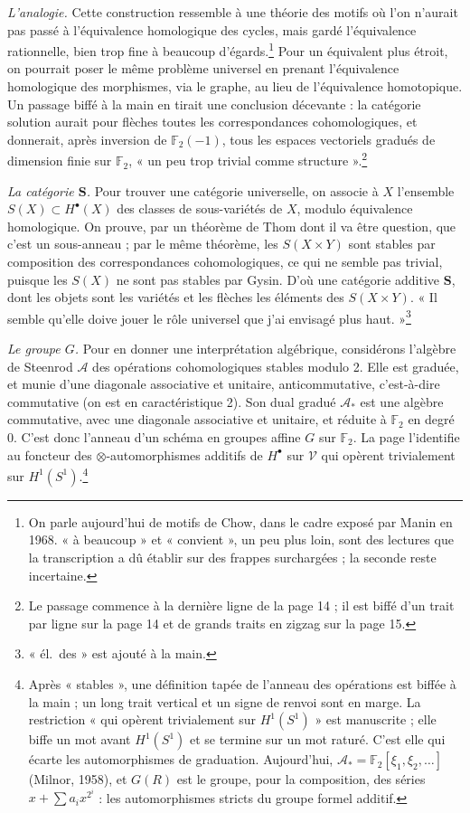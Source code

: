 \documentclass[11pt,a4paper]{article}
\begin{document}
\emph{L'analogie.} Cette construction ressemble à une théorie des motifs où
l'on n'aurait pas passé à l'équivalence homologique des cycles, mais gardé
l'équivalence rationnelle, bien trop fine à beaucoup d'égards.\footnote{On
parle aujourd'hui de motifs de Chow, dans le cadre exposé par Manin en 1968.
« à beaucoup » et « convient », un peu plus loin, sont des lectures que la
transcription a dû établir sur des frappes surchargées ; la seconde reste
incertaine.} Pour un équivalent plus étroit, on pourrait poser le même
problème universel en prenant l'équivalence homologique des morphismes, via le
graphe, au lieu de l'équivalence homotopique. Un passage biffé à la main en
tirait une conclusion décevante : la catégorie solution aurait pour flèches
toutes les correspondances cohomologiques, et donnerait, après inversion de
$\mathbb{F}_2(-1)$, tous les espaces vectoriels gradués de dimension finie sur
$\mathbb{F}_2$, « un peu trop trivial comme structure ».\footnote{Le passage
commence à la dernière ligne de la page 14 ; il est biffé d'un trait par ligne
sur la page 14 et de grands traits en zigzag sur la page 15.}

\emph{La catégorie $\mathbf{S}$.} Pour trouver une catégorie universelle, on
associe à $X$ l'ensemble $S(X) \subset H^{\bullet}(X)$ des classes de
sous-variétés de $X$, modulo équivalence homologique. On prouve, par un
théorème de Thom dont il va être question, que c'est un sous-anneau ; par le
même théorème, les $S(X \times Y)$ sont stables par composition des
correspondances cohomologiques, ce qui ne semble pas trivial, puisque les
$S(X)$ ne sont pas stables par Gysin. D'où une catégorie additive
$\mathbf{S}$, dont les objets sont les variétés et les flèches les éléments des
$S(X \times Y)$. « Il semble qu'elle doive jouer le rôle universel que j'ai
envisagé plus haut. »\footnote{« él.\ des » est ajouté à la main.}

\emph{Le groupe $G$.} Pour en donner une interprétation algébrique,
considérons l'algèbre de Steenrod $\mathcal{A}$ des opérations cohomologiques
stables modulo 2. Elle est graduée, et munie d'une diagonale associative et
unitaire, anticommutative, c'est-à-dire commutative (on est en
caractéristique 2). Son dual gradué $\mathcal{A}_*$ est une algèbre
commutative, avec une diagonale associative et unitaire, et réduite à
$\mathbb{F}_2$ en degré 0. C'est donc l'anneau d'un schéma en groupes affine
$G$ sur $\mathbb{F}_2$. La page l'identifie au foncteur des
$\otimes$-automorphismes additifs de $H^{\bullet}$ sur $\mathcal{V}$ qui
opèrent trivialement sur $H^{1}(S^{1})$.\footnote{Après « stables », une
définition tapée de l'anneau des opérations est biffée à la main ; un long
trait vertical et un signe de renvoi sont en marge. La restriction « qui
opèrent trivialement sur $H^{1}(S^{1})$ » est manuscrite ; elle biffe un mot
avant $H^{1}(S^{1})$ et se termine sur un mot raturé. C'est elle qui écarte les
automorphismes de graduation. Aujourd'hui, $\mathcal{A}_* = \mathbb{F}_2[\xi_1,
\xi_2, \ldots]$ (Milnor, 1958), et $G(R)$ est le groupe, pour la composition,
des séries $x + \sum a_i x^{2^{i}}$ : les automorphismes stricts du groupe
formel additif.}
\end{document}
